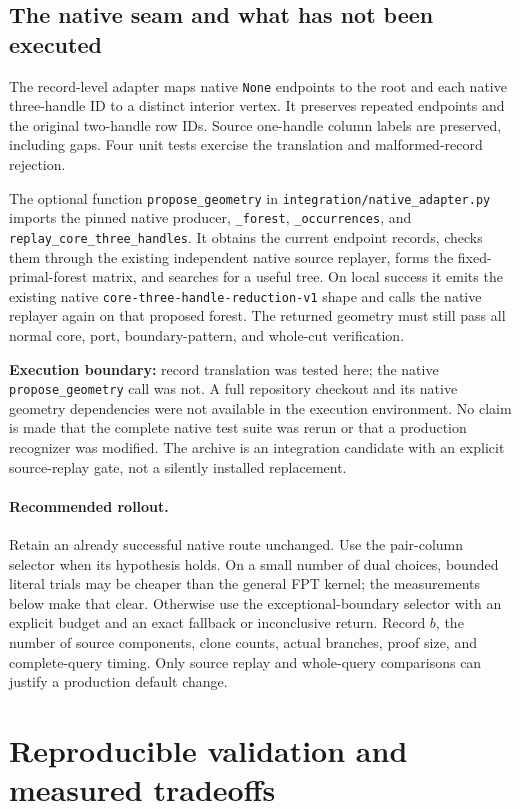 \documentclass[11pt,letterpaper]{article}
\theoremstyle{definition}
\theoremstyle{remark}
\newcommand{\code}[1]{\nolinkurl{#1}}
\begin{document}
\subsection{The native seam and what has not been executed}
The record-level adapter maps native \code{None} endpoints to the root and each
native three-handle ID to a distinct interior vertex. It preserves repeated
endpoints and the original two-handle row IDs. Source one-handle column labels
are preserved, including gaps. Four unit tests exercise the translation and
malformed-record rejection.

The optional function \code{propose_geometry} in
\code{integration/native_adapter.py} imports the pinned native producer,
\code{_forest}, \code{_occurrences}, and
\code{replay_core_three_handles}. It obtains the current endpoint records,
checks them through the existing independent native source replayer, forms the
fixed-primal-forest matrix, and searches for a useful tree. On local success it
emits the existing native \code{core-three-handle-reduction-v1} shape and calls
the native replayer again on that proposed forest. The returned geometry must
still pass all normal core, port, boundary-pattern, and whole-cut verification.

\textbf{Execution boundary:} record translation was tested here; the native
\code{propose_geometry} call was not. A full repository checkout and its native
geometry dependencies were not available in the execution environment. No claim
is made that the complete native test suite was rerun or that a production
recognizer was modified. The archive is an integration candidate with an
explicit source-replay gate, not a silently installed replacement.

\paragraph{Recommended rollout.}
Retain an already successful native route unchanged. Use the pair-column
selector when its hypothesis holds. On a small number of dual choices, bounded
literal trials may be cheaper than the general FPT kernel; the measurements below
make that clear. Otherwise use the exceptional-boundary selector with an
explicit budget and an exact fallback or inconclusive return. Record $b$, the
number of source components, clone counts, actual branches, proof size, and
complete-query timing. Only source replay and whole-query comparisons can
justify a production default change.

\section{Reproducible validation and measured tradeoffs}\label{sec:experiments}
\end{document}
